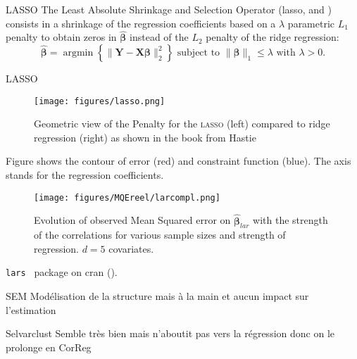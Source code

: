 \documentclass[11pt]{beamer}
\begin{document}
		\begin{frame}{LASSO}
		The Least Absolute Shrinkage and Selection Operator ({\sc lasso}, \cite{tibshirani1996regression} and \cite{tibshiranilasso}) consists in a shrinkage of the regression coefficients based on a $\lambda$ parametric $L_1$ penalty to obtain zeros in $\hat{\boldsymbol{\beta}}$ instead of the $L_2$ penalty of the ridge regression:
		\begin{equation}
		 \boldsymbol{\hat{\beta}}=\operatorname{argmin} \left\lbrace \parallel \boldsymbol{Y}-\boldsymbol{X\beta}\parallel_2^2 \right\rbrace \textrm{ subject to } \parallel\boldsymbol{\beta} \parallel_1\leq \lambda \textrm{ with } \lambda>0 . \nonumber 
		\end{equation}	
		
		
		
		\end{frame}
		\begin{frame}{LASSO}
		\begin{figure}[h!]
			\centering
			\texttt{[image: figures/lasso.png]} 
			\caption{Geometric view of the Penalty for the \textsc{lasso} (left) compared to ridge regression (right) as shown in the book from Hastie \cite{hastie2009elements}} \label{lassogeom}
		\end{figure}
		Figure shows the contour of error (red) and constraint function (blue).
		  The axis stands for the regression coefficients.
		\end{frame}
		
	

\begin{frame}
 \begin{figure}
	 \centering
	  \texttt{[image: figures/MQEreel/larcompl.png]}
	  \caption{Evolution of observed Mean Squared error on $\hat{\boldsymbol{\beta}}_{lar}$ with the strength of the correlations for various sample sizes and strength of regression. $d=5$ covariates. } \label{MQElarcompl}
	\end{figure}	
	{\tt lars } package on {\sc cran} (\cite{packagelars}).
\end{frame}
		
		
		
		\begin{frame}{ SEM }
		 Modélisation de la structure mais à la main et aucun impact sur l'estimation
		 \end{frame}
		 
		\begin{frame}{ Selvarclust }
			Semble très bien mais n'aboutit pas vers la régression donc on le prolonge en CorReg
		\end{frame}
\end{document}
